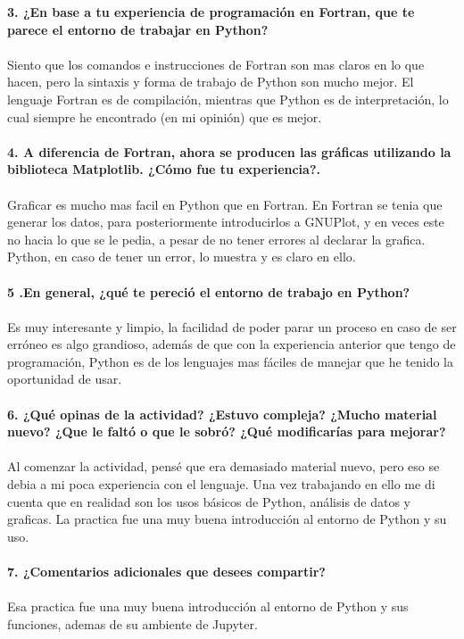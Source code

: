 \documentclass[12pt]{article}
\begin{document}
\noindent\textbf {3. ¿En base a tu experiencia de programación en Fortran, que te parece el entorno de trabajar en Python?} \\ \\
Siento que los comandos e instrucciones de Fortran son mas claros en lo que hacen, pero la sintaxis y forma de trabajo de Python son mucho mejor. El lenguaje Fortran es de compilación, mientras que Python es de interpretación, lo cual siempre he encontrado (en mi opinión) que es mejor. \\ \\

\noindent\textbf {4. A diferencia de Fortran, ahora se producen las gráficas utilizando la biblioteca Matplotlib. ¿Cómo fue tu experiencia?.} \\ \\
Graficar es mucho mas facil en Python que en Fortran. En Fortran se tenia que generar los datos, para posteriormente introducirlos a GNUPlot, y en veces este no hacia lo que se le pedia, a pesar de no tener errores al declarar la grafica. Python, en caso de tener un error, lo muestra y es claro en ello. \\ \\

\noindent\textbf {5 .En general, ¿qué te pereció el entorno de trabajo en Python?} \\ \\
Es muy interesante y limpio, la facilidad de poder parar un proceso en caso de ser erróneo es algo grandioso, además de que con la experiencia anterior que tengo de programación, Python es de los lenguajes mas fáciles de manejar que he tenido la oportunidad de usar.  \\ \\

\noindent\textbf {6. ¿Qué opinas de la actividad? ¿Estuvo compleja? ¿Mucho material nuevo? ¿Que le faltó o que le sobró? ¿Qué modificarías para mejorar?} \\ \\
Al comenzar la actividad, pensé que era demasiado material nuevo, pero eso se debia a mi poca experiencia con el lenguaje. Una vez trabajando en ello me di cuenta que en realidad son los usos básicos de Python, análisis de datos y graficas. La practica fue una muy buena introducción al entorno de Python y su uso. \\ \\

\noindent\textbf {7. ¿Comentarios adicionales que desees compartir?} \\ \\
Esa practica fue una muy buena introducción al entorno de Python y sus funciones, ademas de su ambiente de Jupyter. \\ \\
\end{document}
